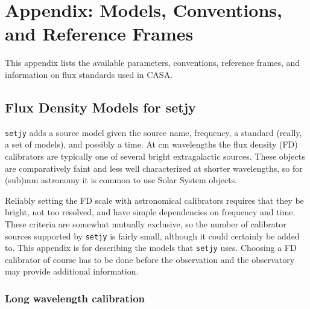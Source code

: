 

\chapter[Appendix: Models, Conventions and Reference Frames]
         {Appendix: Models, Conventions, and Reference Frames}
\label{chapter:conventions}

This appendix lists the available parameters, conventions,
reference frames, and information on flux standards used in CASA.





\section{Flux Density Models for setjy}
\label{section:conventions.fluxdensity}

{\tt setjy} adds a source model given the source name,
frequency, a standard (really, a set of models), and possibly a time.  At cm
wavelengths the flux density (FD) calibrators are typically one of several
bright extragalactic sources.  These objects are comparatively faint and less
well characterized at shorter wavelengths, so for (sub)mm astronomy it is
common to use Solar System objects.

Reliably setting the FD scale with astronomical calibrators requires
that they be bright, not too resolved, and have simple dependencies on
frequency and time.  These criteria are somewhat mutually exclusive, so the
number of calibrator sources supported by {\tt setjy} is fairly small, although it
could certainly be added to.  This appendix is for describing the models that
{\tt setjy} uses.  Choosing a FD calibrator of course has to be done before the
observation and the observatory may provide additional information.

\subsection{Long wavelength calibration}
\label{section:conventions.longwavelength}

